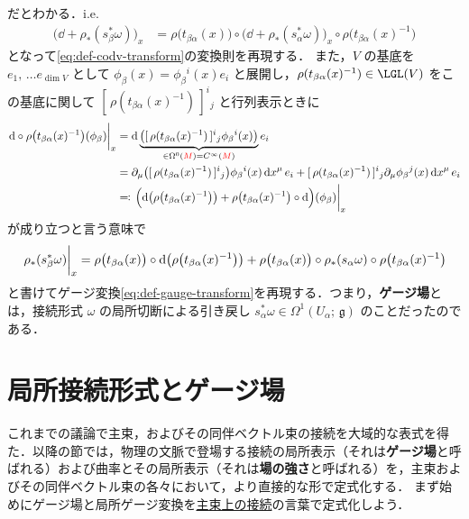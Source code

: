 \documentclass[geometry_main]{subfiles}
\begin{document}
だとわかる．i.e.
\begin{align}
    \bigl(\dd + \rho_* (s^*_\beta \omega)\bigr)_x &= \rho \bigl( t_{\beta\alpha}(x) \bigr) \circ \bigl( \dd + \rho_* (s^*_\alpha \omega) \bigr)_x \circ \rho\bigl(t_{\beta\alpha}(x)^{-1}\bigr)
\end{align}
となって\eqref{eq:def-codv-transform}の変換則を再現する．
また，$V$ の基底を $e_1,\, \dots e_{\dim V}$ として $\phi_\beta(x) = \phi_\beta{}^i (x) e_i$ と展開し，$\rho (t_{\beta\alpha}(x)^{-1}) \in \LGL (V)$ をこの基底に関して $[\, \rho (t_{\beta\alpha}(x)^{-1})\, ]^{i}{}_j$ と行列表示ときに
\begin{align}
    \eval{\dd \circ \rho \bigl( t_{\beta\alpha}(x)^{-1} \bigr) (\phi_\beta)}_x 
    &= \dd\underbrace{\bigl([\, \rho (t_{\beta\alpha}(x)^{-1})\, ]^{i}{}_j \phi_\beta{}^i (x) \bigr)}_{\in \Omega^0(\textcolor{red}{M}) = C^\infty(\textcolor{red}{M})} e_i \\
    &= \partial_\mu \bigl([\, \rho (t_{\beta\alpha}(x)^{-1})\, ]^{i}{}_j \bigr) \phi_{\beta}{}^i (x) \dd{x}^\mu e_i + [\, \rho (t_{\beta\alpha}(x)^{-1})\, ]^{i}{}_j \partial_{\mu} \phi_\beta{}^j (x) \dd{x}^\mu e_i \\
    &\eqqcolon \eval{\Bigl(\dd \bigl(\rho \bigl( t_{\beta\alpha}(x)^{-1} \bigr) \bigr) + \rho \bigl( t_{\beta\alpha}(x)^{-1} \bigr) \circ \dd\Bigr) (\phi_\beta)}_x
\end{align}
が成り立つと言う意味で
\begin{align}
    \eval{\rho_* (s_\beta^* \omega)}_x = \rho \bigl( t_{\beta\alpha}(x) \bigr) \circ \dd \bigl(\rho \bigl( t_{\beta\alpha}(x)^{-1} \bigr)\bigr) + \rho \bigl( t_{\beta\alpha}(x) \bigr) \circ \rho_* (s_\alpha \omega) \circ \rho \bigl( t_{\beta\alpha}(x)^{-1} \bigr)
\end{align}
と書けてゲージ変換\eqref{eq:def-gauge-transform}を再現する．つまり，\textbf{ゲージ場}とは，接続形式 $\omega$ の局所切断による引き戻し $s_\alpha^* \omega \in \Omega^1(U_\alpha;\, \mathfrak{g})$ のことだったのである．

\section{局所接続形式とゲージ場}

これまでの議論で主束，およびその同伴ベクトル束の接続を大域的な表式を得た．以降の節では，物理の文脈で登場する接続の局所表示（それは\textbf{ゲージ場}と呼ばれる）および曲率とその局所表示（それは\textbf{場の強さ}と呼ばれる）を，主束およびその同伴ベクトル束の各々において，より直接的な形で定式化する．
まず始めにゲージ場と局所ゲージ変換を\hyperref[def:connection]{主束上の接続}の言葉で定式化しよう．
\end{document}
